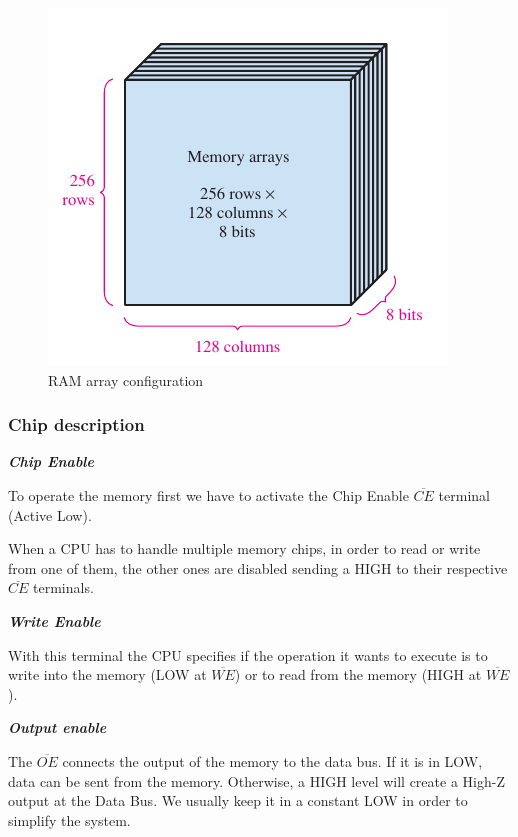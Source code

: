\begin{figure}[H]
    \centering
    \includegraphics[scale = 0.85]{Graphics/RAM/RAM_BLOCK_CONFIG.pdf}
    \caption{RAM array configuration ~\autocite{FLOYD}}
    \label{fig:RAM_BLOCK_CONFIG}
\end{figure}


\subsubsection{Chip description}

\medskip
\hspace{0.5cm}
{\large \textit{\textbf{Chip Enable}}}
\medskip

To operate the memory first we have to activate the Chip Enable $\overline{CE}$  terminal (Active Low). \medskip

When a CPU has to handle multiple memory chips, in order to read or write from one of them, the other ones are disabled sending a HIGH to their respective $\overline{CE}$ terminals. 

\medskip
{\large \textit{\textbf{Write Enable}}}
\medskip

With this terminal the CPU specifies if the operation it wants to execute is to write into the memory (LOW at $\overline{WE}$) or to read from the memory (HIGH at $\overline{WE}$).

\medskip
{\large \textit{\textbf{Output enable}}}
\medskip


The $\overline{OE}$ connects the output of the memory to the data bus. If it is in LOW, data can be sent from the memory. Otherwise, a HIGH level will create a High-Z output at the Data Bus.  We usually keep it in a constant LOW in order to simplify the system.

